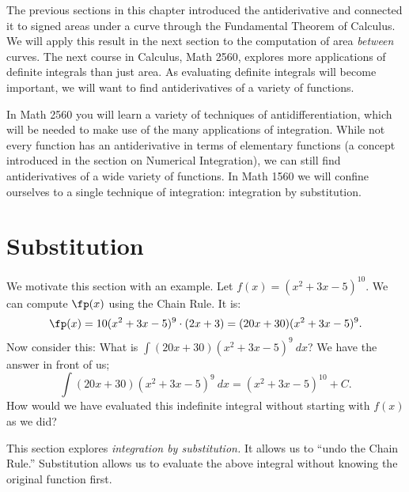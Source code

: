 %

The previous sections in this chapter introduced the antiderivative and connected it to signed areas under a curve through the Fundamental Theorem of Calculus. We will apply this result in the next section to the computation of area \textit{between} curves. The next course in Calculus, Math 2560,  explores more applications of definite integrals than just area. As evaluating definite integrals will become important, we will want to find antiderivatives of a variety of functions.

In Math 2560 you will learn a variety of techniques of antidifferentiation, which will be needed to make use of the many applications of integration. While not every function has an antiderivative in terms of elementary functions (a concept introduced in the section on Numerical Integration), we can still find antiderivatives of a wide variety of functions. In Math 1560 we will confine ourselves to a single technique of integration: integration by substitution.


\section{Substitution}\label{sec:substitution}

We motivate this section with an example. Let $f(x) = (x^2+3x-5)^{10}$. We can compute $\fp(x)$ using the Chain Rule. It is:
	$$\fp(x) = 10(x^2+3x-5)^9\cdot(2x+3) = (20x+30)(x^2+3x-5)^9.$$
Now consider this: What is $\int (20x+30)(x^2+3x-5)^9\ dx$? We have the answer in front of us; $$\int (20x+30)(x^2+3x-5)^9\ dx = (x^2+3x-5)^{10}+C.$$
How would we have evaluated this indefinite integral without starting with $f(x)$ as we did?

This section explores \textit{integration by substitution.} It allows us to ``undo the Chain Rule.'' Substitution allows us to evaluate the above integral without knowing the original function first.

